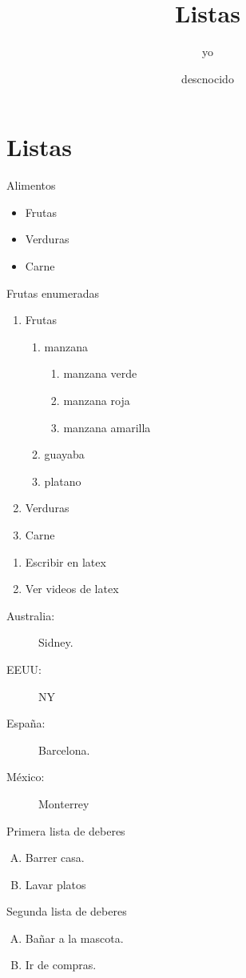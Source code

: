 \documentclass{article}
\title{Listas}
\author{yo}
\date{descnocido}
\begin{document}
\maketitle

\section{Listas}
Alimentos
\begin{itemize}
  \item Frutas
  \item Verduras
  \item Carne
\end{itemize}

Frutas enumeradas
\begin{enumerate}
  \item Frutas
  \begin{enumerate}
    \item manzana
    \begin{enumerate}
      \item manzana verde
      \item manzana roja
      \item manzana amarilla
    \end{enumerate}
    \item guayaba
    \item platano
  \end{enumerate}
  \item Verduras
  \item Carne 
\end{enumerate}

\begin{enumerate}[{Ejercicio}1.]
  \item Escribir en latex
  \item Ver videos de latex
\end{enumerate}

\begin{description}
  \item[Australia:] Sidney.
  \item[EEUU:] NY
  \item[España:] Barcelona.
  \item[México:] Monterrey    
\end{description}

Primera lista de deberes
\begin{enumerate}[(A)]
  \item Barrer casa.
  \item Lavar platos
  \setcounter{ncon}{\value{enumi}} %
\end{enumerate}
Segunda lista de deberes
\begin{enumerate}[(A)]
  \setcounter{enumi}{\value{ncon}} %
  \item Bañar a la mascota.
  \item Ir de compras.
\end{enumerate}
\end{document}
